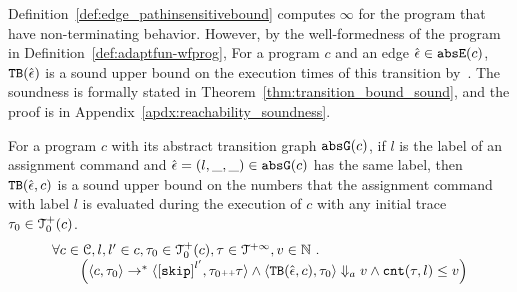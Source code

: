 \begin{enumerate}
Definition~\ref{def:edge_pathinsensitivebound} computes $\infty$ for the program that
have non-terminating behavior.
However, by the well-formedness of the program in Definition~\ref{def:adaptfun-wfprog}, 
For a program $c$ and an edge $\hat{\mathtt{\epsilon}{}} \in \mathtt{abs}{\mathtt{E}}(c)$,
${\mathtt{TB}}(\hat{\mathtt{\epsilon}{}})$ is a sound upper bound
on the execution times of this transition by~\cite{SinnZV17}.
The soundness is formally stated in Theorem~\ref{thm:transition_bound_sound}, and the proof is in Appendix~\ref{apdx:reachability_soundness}.
%
\begin{thm}
 \label{thm:transition_bound_sound}
For a program ${c}$ with its abstract transition graph $\mathtt{abs}{\mathtt{G}}(c)$, if $l$ is the label of an assignment 
command and $\hat{\mathtt{\epsilon}{}} = (l, \_, \_) \in \mathtt{abs}{\mathtt{G}}(c)$ has the same label,
then ${\mathtt{TB}}(\hat{\mathtt{\epsilon}{}}, c)$ 
 is a sound upper bound on 
the numbers that the assignment command with label $l$ is evaluated during the execution of $c$ with any
initial trace $\mathtt{\tau}_0 \in \mathcal{T}^{+}_0(c)$.
 \[
 \begin{array}{l}
 \forall c \in \cdom, l, l' \in c,\trace_0 \in \ftdom_0(c), 
 \trace \in \tdom, v \in \mathbb{N}
 \st 
 \\ \qquad 
 \Big(\config{{c}, \trace_0} \to^{*} \config{\clabel{\eskip}^{l'}, \trace_0\tracecat\vtrace} 
 \land \config{\absclr(\absevent, c), \trace_0} \aarrow v
 \land
 \vcounter(\trace, l) \leq v
 \Big)
 \end{array}
 \]
\end{thm}
%
\end{enumerate}


